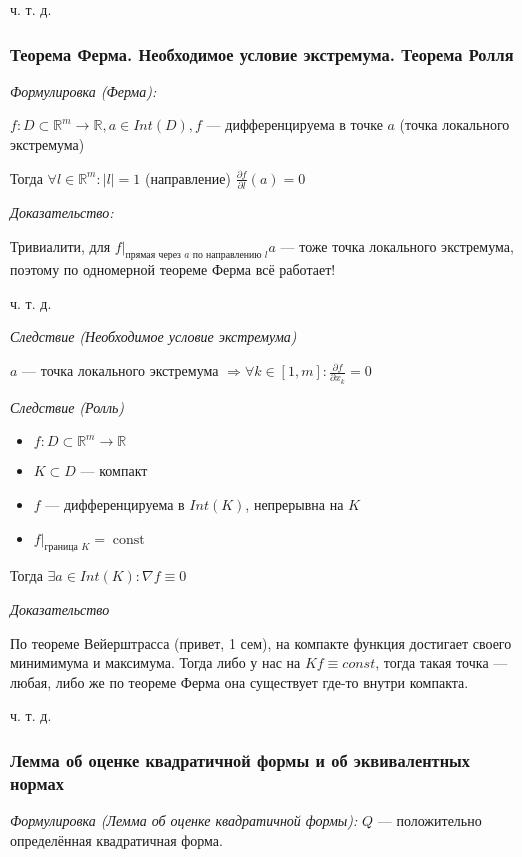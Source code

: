 \documentclass{article}
\DeclareMathOperator{\const}{const}
\begin{document}
ч. т. д.

\subsubsection{Теорема Ферма. Необходимое условие экстремума. Теорема Ролля}
\textit{Формулировка (Ферма):}

$f: D \subset \mathbb{R}^m \rightarrow \mathbb{R}, a \in Int(D), f$ --- дифференцируема в точке $a$ (точка локального экстремума)

Тогда $\forall l \in \mathbb{R}^m: |l| = 1$ (направление) $\frac{\partial f}{\partial l}(a) = 0$


\textit{Доказательство:}

Тривиалити, для $f|_{\text{прямая через }a\text{ по направлению }l} a$ --- тоже точка локального экстремума, поэтому по одномерной теореме Ферма всё работает!

ч. т. д.

\textit{Следствие (Необходимое условие экстремума)}

$a$ --- точка локального экстремума $\Rightarrow \forall k \in [1, m]: \frac{\partial f}{\partial x_k} = 0$

\textit{Следствие (Ролль)}
\begin{itemize}
    \item $f: D \subset \mathbb{R}^m \rightarrow \mathbb{R}$
    \item $K \subset D$ --- компакт
    \item $f$ --- дифференцируема в $Int(K)$, непрерывна на $K$
    \item $f|_{\text{граница }K} = \const$
\end{itemize}

Тогда $\exists a \in Int(K): \nabla f \equiv 0$

\textit{Доказательство}

По теореме Вейерштрасса (привет, 1 сем), на компакте функция достигает своего минимимума и максимума.
Тогда либо у нас на $K f \equiv const$, тогда такая точка --- любая, либо же по теореме Ферма она существует где-то внутри компакта.

ч. т. д.



\subsubsection{Лемма об оценке квадратичной формы и об эквивалентных нормах}
\textit{Формулировка (Лемма об оценке квадратичной формы):}
$Q$ --- положительно определённая квадратичная форма.
\end{document}
